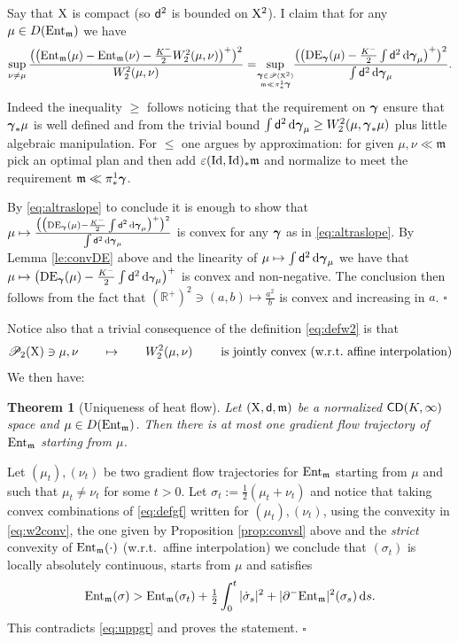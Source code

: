 \documentclass[11pt]{article}
\numberwithin{equation}{section}
\newtheorem{theorem}{Theorem}[section]
\newenvironment{idea}{\removelastskip\par\medskip   %
\noindent{\em Idea of the proof} \rm}{\penalty-20\null\hfill$\square$\par\medbreak}
\newcommand{\R}{\mathbb{R}}
\newcommand{\ggamma}{{\mbox{\boldmath$\gamma$}}}
\newcommand{\sggamma}{{\mbox{\scriptsize\boldmath$\gamma$}}}
\newcommand{\pr}{\mathscr P}
\newcommand{\prd}{\mathscr P_2}
\newcommand{\X}{{\rm X}}
\newcommand{\sfd}{{\sf d}}
\newcommand{\mm}{{\mathfrak m}}
\newcommand{\CD}{{\sf CD}}
\newcommand{\ent}{{\rm Ent}_\mm}
\renewcommand{\d}{{\rm d}}
\newcommand{\eps}{\varepsilon}
\newcommand{\Id}{{\rm Id}}
\newcommand{\ssggamma}{{\mbox{\tiny\boldmath$\gamma$}}}
\begin{document}
\begin{idea} Say that $\X$ is compact (so $\sfd^2$ is bounded on $\X^2$). I claim that for any $\mu\in D(\ent)$ we have
\begin{equation}
\label{eq:altraslope}
\sup_{\nu\neq\mu}\frac{\big(\big(\ent(\mu)-\ent(\nu)-\tfrac{K^-}2W_2^2(\mu,\nu)\big)^+\big)^2}{W_2^2(\mu,\nu)}=\!\!\sup_{\sggamma\in\pr(\X^2)\atop \mm\ll\pi^1_*\sggamma}\!\!\frac{\big(\big({\rm DE}_\sggamma(\mu)-\tfrac{K^-}2\int\sfd^2\,\d\ggamma_\mu\big)^+\big)^2}{\int\sfd^2\,\d\ggamma_\mu}.
\end{equation}
Indeed the inequality $\geq$ follows noticing that the requirement on $\ggamma$ ensure that $\ggamma_*\mu$ is well defined and  from the trivial bound $\int\sfd^2\,\d\ggamma_\mu\geq W_2^2(\mu,\ggamma_*\mu)$ plus little algebraic manipulation. For $\leq$ one argues by approximation: for given $\mu,\nu\ll\mm$ pick an optimal plan and then add $\eps(\Id,\Id)_*\mm $ and normalize to  meet the requirement $\mm\ll\pi^1_*\ggamma$.

By \eqref{eq:altraslope} to conclude it is enough to show  that $\mu\mapsto\frac{\big(\big({\rm DE}_\ssggamma(\mu)-\frac{K^-}2\int\sfd^2\,\d\sggamma_\mu\big)^+\big)^2}{\int\sfd^2\,\d\sggamma_\mu} $ is convex for any $\ggamma$ as in \eqref{eq:altraslope}.  By Lemma \ref{le:convDE} above and the linearity of $\mu\mapsto \int\sfd^2\,\d\ggamma_\mu$ we have that $\mu\mapsto \big({\rm DE}_\sggamma(\mu)-\tfrac{K^-}2\int\sfd^2\,\d\sggamma_\mu\big)^+$ is convex and non-negative. The conclusion then follows from the fact that $(\R^+)^2\ni(a,b)\mapsto\frac{a^2}b$ is convex and increasing in $a$.
\end{idea}
Notice also that a trivial consequence of the definition \eqref{eq:defw2} is that
\begin{equation}
\label{eq:w2conv}
\prd(\X)\ni \mu,\nu\qquad\mapsto\qquad W_2^2(\mu,\nu)\qquad\text{ is jointly convex (w.r.t.\ affine interpolation)}
\end{equation}
We then have:\begin{theorem}[Uniqueness of heat flow]\label{thm:uniqueheat}
Let $(\X,\sfd,\mm)$ be a normalized $\CD(K,\infty)$ space and $\mu\in D(\ent)$. Then there is at most one gradient flow trajectory of $\ent$ starting from $\mu$.
\end{theorem}
\begin{idea} Let $(\mu_t),(\nu_t)$ be two gradient flow trajectories for $\ent$ starting from $\mu$ and such that $\mu_t\neq \nu_t$ for some $t>0$. Let $\sigma_t:=\tfrac12(\mu_t+\nu_t)$ and notice that  taking convex combinations of \eqref{eq:defgf} written for $(\mu_t),(\nu_t)$, using the convexity in \eqref{eq:w2conv}, the one given by Proposition \ref{prop:convsl} above and the \emph{strict} convexity of $\ent(\cdot)$ (w.r.t.\ affine interpolation) we conclude that $(\sigma_t)$ is locally absolutely continuous, starts from $\mu$ and satisfies
\[
\ent(\sigma)>\ent(\sigma_t)+\tfrac12\int_0^t|\dot\sigma_s|^2+|\partial^-\ent|^2(\sigma_s)\,\d s.
\]
This contradicts \eqref{eq:uppgr} and proves the statement.
\end{idea}
\end{document}
